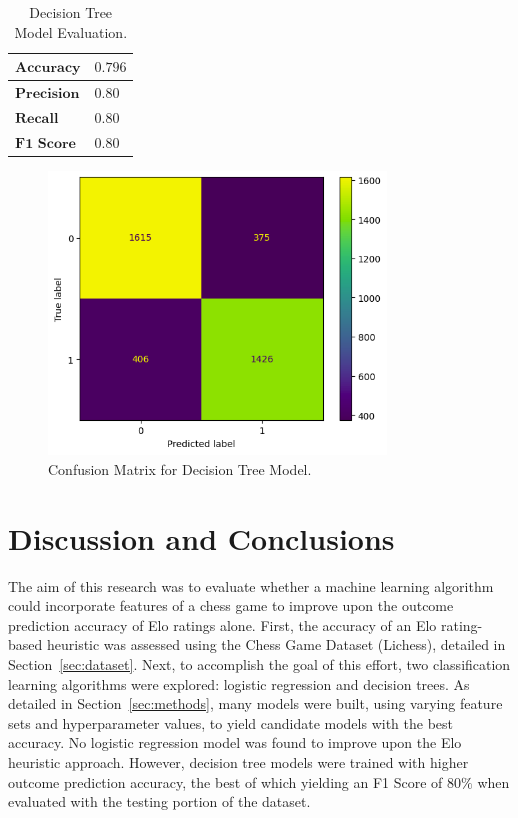 \documentclass[12pt]{article}
\begin{document}
\begin{table}[h!]
\centering
\begin{tabular}{|l|l|}
\hline
$\textbf{Accuracy}$ & $0.796$ \\ \hline
$\textbf{Precision}$ & $0.80$ \\ \hline
$\textbf{Recall}$ & $0.80$ \\ \hline
$\textbf{F1 Score}$ & $0.80$ \\ \hline
\end{tabular}
\caption{Decision Tree Model Evaluation.}
\label{tab:dt-eval}
\end{table}

\begin{figure}[H]
\centering
\includegraphics[width=0.8\textwidth]{conf-matrix-dt.png}
\caption{Confusion Matrix for Decision Tree Model.}
\label{fig:conf-matrix-dt}
\end{figure}


\section{Discussion and Conclusions}
\label{sec:discussion}

The aim of this research was to evaluate whether a machine learning algorithm could incorporate features of a chess game to improve upon the outcome prediction accuracy of Elo ratings alone. First, the accuracy of an Elo rating-based heuristic was assessed using the Chess Game Dataset (Lichess), detailed in Section~\ref{sec:dataset}. Next, to accomplish the goal of this effort, two classification learning algorithms were explored: logistic regression and decision trees. As detailed in Section~\ref{sec:methods}, many models were built, using varying feature sets and hyperparameter values, to yield candidate models with the best accuracy. No logistic regression model was found to improve upon the Elo heuristic approach. However, decision tree models were trained with higher outcome prediction accuracy, the best of which yielding an F1 Score of $80\%$ when evaluated with the testing portion of the dataset.
\end{document}
